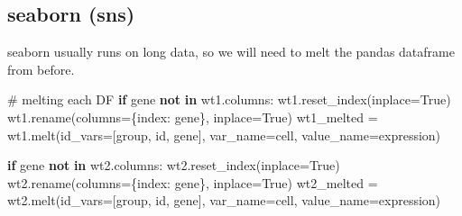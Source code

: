 \documentclass[
  letterpaper,
  DIV=11,
  numbers=noendperiod]{scrartcl}
\newenvironment{Shaded}{\begin{snugshade}}{\end{snugshade}}
\newcommand{\CommentTok}[1]{\textcolor[rgb]{0.37,0.37,0.37}{#1}}
\newcommand{\ControlFlowTok}[1]{\textcolor[rgb]{0.00,0.23,0.31}{\textbf{#1}}}
\newcommand{\KeywordTok}[1]{\textcolor[rgb]{0.00,0.23,0.31}{\textbf{#1}}}
\newcommand{\NormalTok}[1]{\textcolor[rgb]{0.00,0.23,0.31}{#1}}
\newcommand{\OperatorTok}[1]{\textcolor[rgb]{0.37,0.37,0.37}{#1}}
\newcommand{\StringTok}[1]{\textcolor[rgb]{0.13,0.47,0.30}{#1}}
\newcommand{\VariableTok}[1]{\textcolor[rgb]{0.07,0.07,0.07}{#1}}
\begin{document}
\subsection{seaborn (sns)}\label{seaborn-sns}

seaborn usually runs on long data, so we will need to melt the pandas
dataframe from before.

\begin{Shaded}
\begin{Highlighting}[]
\CommentTok{\# melting each DF}
\ControlFlowTok{if} \StringTok{\textquotesingle{}gene\textquotesingle{}} \KeywordTok{not} \KeywordTok{in}\NormalTok{ wt1.columns:}
\NormalTok{    wt1.reset\_index(inplace}\OperatorTok{=}\VariableTok{True}\NormalTok{)}
\NormalTok{    wt1.rename(columns}\OperatorTok{=}\NormalTok{\{}\StringTok{\textquotesingle{}index\textquotesingle{}}\NormalTok{: }\StringTok{\textquotesingle{}gene\textquotesingle{}}\NormalTok{\}, inplace}\OperatorTok{=}\VariableTok{True}\NormalTok{)}
\NormalTok{wt1\_melted }\OperatorTok{=}\NormalTok{ wt1.melt(id\_vars}\OperatorTok{=}\NormalTok{[}\StringTok{\textquotesingle{}group\textquotesingle{}}\NormalTok{, }\StringTok{\textquotesingle{}id\textquotesingle{}}\NormalTok{, }\StringTok{\textquotesingle{}gene\textquotesingle{}}\NormalTok{], var\_name}\OperatorTok{=}\StringTok{\textquotesingle{}cell\textquotesingle{}}\NormalTok{, value\_name}\OperatorTok{=}\StringTok{\textquotesingle{}expression\textquotesingle{}}\NormalTok{)}

\ControlFlowTok{if} \StringTok{\textquotesingle{}gene\textquotesingle{}} \KeywordTok{not} \KeywordTok{in}\NormalTok{ wt2.columns:}
\NormalTok{    wt2.reset\_index(inplace}\OperatorTok{=}\VariableTok{True}\NormalTok{)}
\NormalTok{    wt2.rename(columns}\OperatorTok{=}\NormalTok{\{}\StringTok{\textquotesingle{}index\textquotesingle{}}\NormalTok{: }\StringTok{\textquotesingle{}gene\textquotesingle{}}\NormalTok{\}, inplace}\OperatorTok{=}\VariableTok{True}\NormalTok{)}
\NormalTok{wt2\_melted }\OperatorTok{=}\NormalTok{ wt2.melt(id\_vars}\OperatorTok{=}\NormalTok{[}\StringTok{\textquotesingle{}group\textquotesingle{}}\NormalTok{, }\StringTok{\textquotesingle{}id\textquotesingle{}}\NormalTok{, }\StringTok{\textquotesingle{}gene\textquotesingle{}}\NormalTok{], var\_name}\OperatorTok{=}\StringTok{\textquotesingle{}cell\textquotesingle{}}\NormalTok{, value\_name}\OperatorTok{=}\StringTok{\textquotesingle{}expression\textquotesingle{}}\NormalTok{)}


\end{Highlighting}
\end{Shaded}
\end{document}
